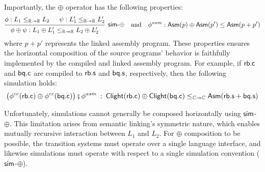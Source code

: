 Importantly,
the $\oplus$ operator has the following properties:
\[
  \begin{prooftree}
    \hypo{\phi : L_1 \le_{\mathbb{R} \twoheadrightarrow \mathbb{R}} L_2}
    \hypo{\psi : L'_1 \le_{\mathbb{R} \twoheadrightarrow \mathbb{R}} L'_2}
    \infer2[\kw{sim}-$\oplus$]
    {\phi \oplus \psi : L_1 \oplus L'_1 \le_{\mathbb{R} \twoheadrightarrow \mathbb{R}} L_2 \oplus L'_2}
  \end{prooftree}
  \quad
  \text{and}
  \quad
  \phi^{asm}: \kw{Asm}(p) \oplus \kw{Asm}(p') \le \kw{Asm}(p + p')
\]
where $p + p'$
represents the linked assembly program.
These properties
ensures the horizontal composition
of the source programs' behavior
is faithfully implemented
by the compiled and linked assembly program.
For example,
if $ \mathsf{rb.c} $ and $ \mathsf{bq.c} $
are compiled to $ \mathsf{rb.s} $ and $ \mathsf{bq.s} $,
respectively,
then the following simulation holds:
\[
  \bigl(\phi^{cc}( \mathsf{rb.c} ) \oplus \phi^{cc}( \mathsf{bq.c} )\bigr)
  \fatsemi \phi^{asm} \::\:
   \mathsf{Clight} ( \mathsf{rb.c} ) \oplus  \mathsf{Clight} ( \mathsf{bq.c} )
  \le_{\mathbb{C} \twoheadrightarrow \mathbb{C}}
   \mathsf{Asm} ( \mathsf{rb.s}  +  \mathsf{bq.s} )
\]

Unfortunately,
simulations cannot generally be composed horizontally
using $ \mathsf{sim} $-$\oplus$.
This limitation arises from semantic linking's symmetric nature,
which enables mutually recursive interaction between $L_1$ and $L_2$.
For $\oplus$ composition to be possible,
the transition systems must operate
over a single language interface,
and likewise simulations must operate
with respect to a single simulation convention
($ \mathsf{sim} $-$\oplus$).




